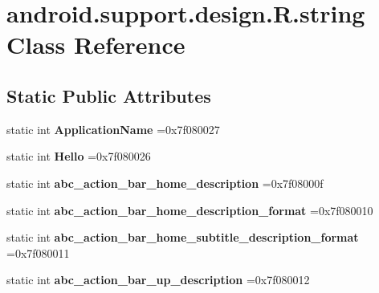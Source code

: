 \hypertarget{classandroid_1_1support_1_1design_1_1R_1_1string}{}\section{android.\+support.\+design.\+R.\+string Class Reference}
\label{classandroid_1_1support_1_1design_1_1R_1_1string}
\subsection*{Static Public Attributes}
\begin{DoxyCompactItemize}
\item 
\mbox{\label{classandroid_1_1support_1_1design_1_1R_1_1string_a269329b424039b1ce2768d5bc62a7e95}} 
static int {\bfseries Application\+Name} =0x7f080027
\item 
\mbox{\label{classandroid_1_1support_1_1design_1_1R_1_1string_ad5172f1d7e2cf258b8833a8eb2a8e08e}} 
static int {\bfseries Hello} =0x7f080026
\item 
\mbox{\label{classandroid_1_1support_1_1design_1_1R_1_1string_acc95a77a2176521ef906d9a861fe1d9d}} 
static int {\bfseries abc\+\_\+action\+\_\+bar\+\_\+home\+\_\+description} =0x7f08000f
\item 
\mbox{\label{classandroid_1_1support_1_1design_1_1R_1_1string_ae0878481f09437063a740b2c48abe898}} 
static int {\bfseries abc\+\_\+action\+\_\+bar\+\_\+home\+\_\+description\+\_\+format} =0x7f080010
\item 
\mbox{\label{classandroid_1_1support_1_1design_1_1R_1_1string_a860ede49df9bb0d83a3d0c5425474ea6}} 
static int {\bfseries abc\+\_\+action\+\_\+bar\+\_\+home\+\_\+subtitle\+\_\+description\+\_\+format} =0x7f080011
\item 
\mbox{\label{classandroid_1_1support_1_1design_1_1R_1_1string_ac229971bf840d179932f13dd627e0753}} 
static int {\bfseries abc\+\_\+action\+\_\+bar\+\_\+up\+\_\+description} =0x7f080012

\end{DoxyCompactItemize}
